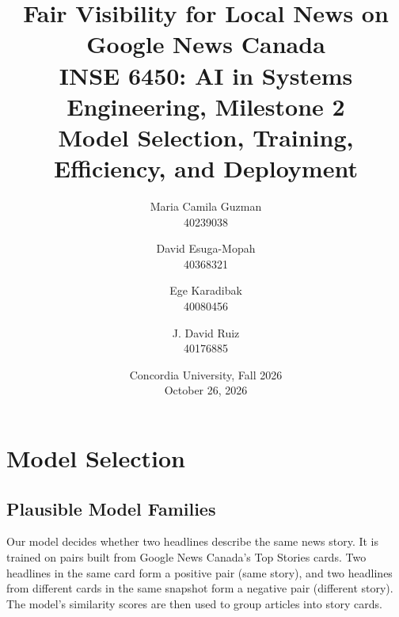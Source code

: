 \documentclass[11pt,letterpaper]{article}
\title{Fair Visibility for Local News on Google News Canada\\[4pt]
\large INSE 6450: AI in Systems Engineering, Milestone 2\\[2pt]
\normalsize Model Selection, Training, Efficiency, and Deployment}
\author{
Maria Camila Guzman \\ \small 40239038 \and
David Esuga-Mopah \\ \small 40368321 \and
Ege Karadibak \\ \small 40080456 \and
J. David Ruiz \\ \small 40176885}
\date{Concordia University, Fall 2026 \\ October 26, 2026}
\begin{document}
\maketitle


\section{Model Selection}

\subsection{Plausible Model Families}

Our model decides whether two headlines describe the same news story. It is trained on pairs built from Google News Canada's Top Stories cards. Two headlines in the same card form a positive pair (same story), and two headlines from different cards in the same snapshot form a negative pair (different story). The model's similarity scores are then used to group articles into story cards.
\end{document}
